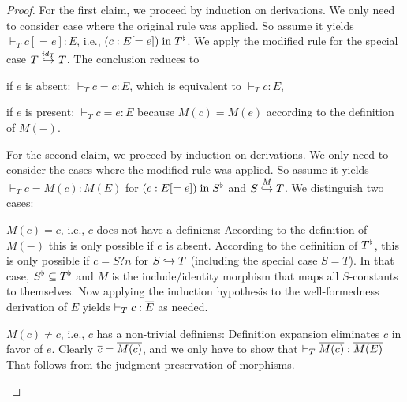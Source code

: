 \begin{proof}
For the first claim, we proceed by induction on derivations.
We only need to consider case where the original rule was applied.
So assume it yields $\vdash_T c[=e]:E$, i.e., $(c:E[=e]) \minn \flt{T}$.
We apply the modified rule for the special case $\ipc{\id{T}}{T}{T}$.
The conclusion reduces to
\begin{compactitem}
 \item if $e$ is absent: $\vdash_T c=c:E$, which is equivalent to $\vdash_T c:E$,
 \item if $e$ is present: $\vdash_T c=e:E$ because $M(c)=M(e)$ according to the definition of $M(-)$.
\end{compactitem}

For the second claim, we proceed by induction on derivations.
We only need to consider the cases where the modified rule was applied.
So assume it yields $\vdash_T c=M(c):M(E)$ for $(c:E[=e]) \minn \flt{S}$ and $\ipc{M}{S}{T}$.
We distinguish two cases:
\begin{compactitem}
 \item $M(c)=c$, i.e., $c$ does not have a definiens:
   According to the definition of $M(-)$ this is only possible if $e$ is absent.
   According to the definition of $\flt{T}$, this is only possible if $c=S?n$ for $S\harr T$ (including the special case $S=T$).
   In that case, $\flt{S}\sq\flt{T}$ and $M$ is the include/identity morphism that maps all $S$-constants to themselves.
   Now applying the induction hypothesis to the well-formedness derivation of $E$ yields $\vdash_T c:\ov{E}$ as needed.
 \item $M(c)\neq c$, i.e., $c$ has a non-trivial definiens:
  Definition expansion eliminates $c$ in favor of $e$.
  Clearly $\ov{c}=\ov{M(c)}$, and we only have to show that $\vdash_T \ov{M(c)}:\ov{M(E)}$ That follows from the judgment preservation of morphisms.
\end{compactitem}
\end{proof}

